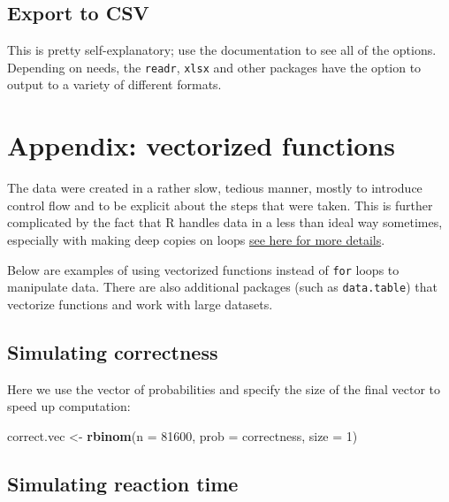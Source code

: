 \documentclass[]{article}
\newenvironment{Shaded}{\begin{snugshade}}{\end{snugshade}}
\newcommand{\KeywordTok}[1]{\textcolor[rgb]{0.13,0.29,0.53}{\textbf{{#1}}}}
\newcommand{\DataTypeTok}[1]{\textcolor[rgb]{0.13,0.29,0.53}{{#1}}}
\newcommand{\DecValTok}[1]{\textcolor[rgb]{0.00,0.00,0.81}{{#1}}}
\newcommand{\StringTok}[1]{\textcolor[rgb]{0.31,0.60,0.02}{{#1}}}
\newcommand{\NormalTok}[1]{{#1}}
\begin{document}
\subsection{Export to CSV}\label{export-to-csv}

This is pretty self-explanatory; use the documentation to see all of the
options. Depending on needs, the \texttt{readr}, \texttt{xlsx} and other
packages have the option to output to a variety of different formats.

\section{Appendix: vectorized
functions}\label{appendix-vectorized-functions}

The data were created in a rather slow, tedious manner, mostly to
introduce control flow and to be explicit about the steps that were
taken. This is further complicated by the fact that R handles data in a
less than ideal way sometimes, especially with making deep copies on
loops \href{http://adv-r.had.co.nz/memory.html}{see here for more
details}.

Below are examples of using vectorized functions instead of \texttt{for}
loops to manipulate data. There are also additional packages (such as
\texttt{data.table}) that vectorize functions and work with large
datasets.

\subsection{Simulating correctness}\label{simulating-correctness}

Here we use the vector of probabilities and specify the size of the
final vector to speed up computation:

\begin{Shaded}
\begin{Highlighting}[]
\NormalTok{correct.vec <-}\StringTok{ }\KeywordTok{rbinom}\NormalTok{(}\DataTypeTok{n =} \DecValTok{81600}\NormalTok{, }\DataTypeTok{prob =} \NormalTok{correctness, }\DataTypeTok{size =} \DecValTok{1}\NormalTok{)}
\end{Highlighting}
\end{Shaded}

\subsection{Simulating reaction time}\label{simulating-reaction-time}
\end{document}
